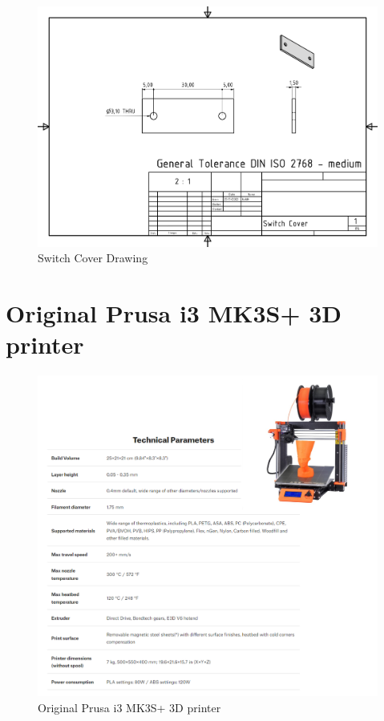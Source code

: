 \begin{figure}[H]
    \centering
    \includegraphics[width=1.3\linewidth, angle = 90]{texs/appendix/data/technicaldrawing/switchcover.jpg}
    \caption{Switch Cover Drawing}
    \label{fig:cad-drawing-switchcover}
\end{figure}


\section{Original Prusa i3 MK3S+ 3D printer}
\label{appendix:original-prusa-i3-mk3s-3d-printer}

\begin{figure}[H]
    \centering
    \includegraphics[width=\linewidth]{texs/appendix/data/techspecs/prusa.png}
    \caption{Original Prusa i3 MK3S+ 3D printer}
    \label{fig:3d-printer-1}
\end{figure}

